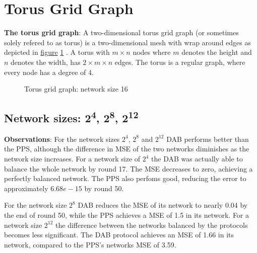 \section{Torus Grid Graph}
\textbf{The torus grid graph}: A two-dimensional torus grid graph (or sometimes solely refered to as torus) is a two-dimensional mesh with wrap around edges as depicted in \hyperref[fig:torusGraph]{figure} \ref{fig:torusGraph} \cite{Mahlmann2010}. A torus with $m \times n$ nodes where $m$ denotes the height and $n$ denotes the width, has $2\times m \times n$ edges. The torus is a regular graph, where every node has a degree of 4.

\begin{figure}[H]
    \centering
    \scalebox{1.5}{}
    \caption{Torus grid graph: network size 16}
    \label{fig:torusGraph}
\end{figure}

\subsection{Network sizes: 2\textsuperscript{4}, 2\textsuperscript{8}, 2\textsuperscript{12}}
\textbf{Observations}: For the network sizes $2^{4}$, $2^{8}$ and $2^{12}$ DAB performs better than the PPS, although the difference in MSE of the two networks diminishes as the network size increases. For a network size of $2^{4}$ the DAB was actually able to balance the whole network by round 17. The MSE decreases to zero, achieving a perfectly balanced network. The PPS also perfoms good, reducing the error to approximately $6.68e-15$ by round 50.

For the network size $2^{8}$ DAB reduces the MSE of its network to nearly 0.04 by the end of round 50, while the PPS achieves a MSE of 1.5 in its network. For a network size $2^{12}$ the difference between the networks balanced by the protocols becomes less significant. The DAB protocol achieves an MSE of 1.66 in its network, compared to the PPS's networks MSE of 3.59.

